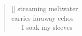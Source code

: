 \documentclass[11pt,a4paper]{article}
\begin{document}
\thispagestyle{empty}

\poemtitle{}

\settowidth{\versewidth}{carries faraway echos}

\bigskip

\begin{verse}[\versewidth]
streaming meltwater \\
carries faraway echos \\
---~I soak my sleeves
\end{verse}
\end{document}
